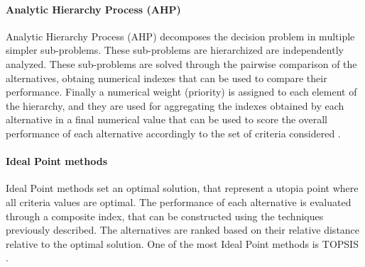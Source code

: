 \begin{refsection}[referencesCh1]
\paragraph{Analytic Hierarchy Process (AHP)}
Analytic Hierarchy Process (AHP) decomposes the decision problem in multiple simpler sub-problems. These sub-problems are hierarchized are independently analyzed. These sub-problems are solved through the pairwise comparison of the alternatives, obtaing numerical indexes that can be used to compare their performance. Finally a numerical weight (priority) is assigned to each element of the hierarchy, and they are used for aggregating the indexes obtained by each alternative in a final numerical value that can be used to score the overall performance of each alternative accordingly to the set of criteria considered \citep{saaty2000fundamentals}. 

\paragraph{Ideal Point methods}
Ideal Point methods set an optimal solution, that represent a utopia point where all criteria values are optimal. The performance of each alternative is evaluated through a composite index, that can be constructed using the techniques previously described. The alternatives are ranked based on their relative distance relative to the optimal solution. One of the most Ideal Point methods is TOPSIS \citep{hwang1995multi}.




\end{refsection}
